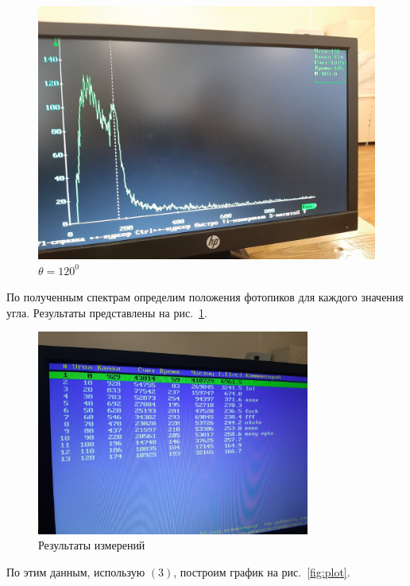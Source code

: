 \documentclass[a4paper, 12pt]{article}
\begin{document}
\begin{figure}[h]
\begin{minipage}[h]{0.3\linewidth}
\includegraphics[width = 1\linewidth]{120.jpg}
\caption{$\theta = 120^0$}
\end{minipage}
\end{figure}

\newpage

По полученным спектрам определим положения фотопиков для каждого значения угла. Результаты представлены на рис.~\ref{tab:all}.

\begin{figure}[h]
\begin{center}
\includegraphics[width = 0.8\textwidth]{tab.jpg}
\caption{Результаты измерений}
\label{tab:all}
\end{center}
\end{figure}

По этим данным, использую $(3)$, построим график на рис.~\ref{fig:plot}.
\end{document}
